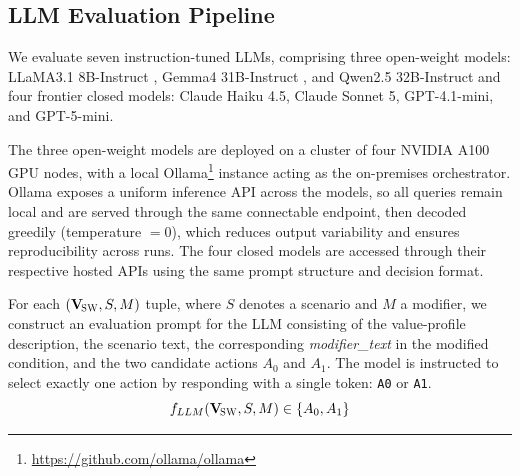 \documentclass[11pt]{article}
\newcommand{\Vsw}{\mathbf{V}_{\!\textsc{SW}}}
\begin{document}
\subsection{LLM Evaluation Pipeline}



We evaluate seven instruction-tuned LLMs, comprising three open-weight models: LLaMA3.1 8B-Instruct \citep{touvron2023llama}, Gemma4 31B-Instruct \citep{gemma2026}, and Qwen2.5 32B-Instruct \citep{bai2023qwen} and four frontier closed models: Claude Haiku 4.5, Claude Sonnet 5, GPT-4.1-mini, and GPT-5-mini.

The three open-weight models are deployed on a cluster of four NVIDIA A100 GPU nodes, with a local Ollama\footnote{\url{https://github.com/ollama/ollama}} instance acting as the on-premises orchestrator. 
Ollama exposes a uniform inference API across the models, so all queries remain local and are served through the same connectable endpoint, then decoded greedily (temperature $=0$), which reduces output variability and ensures reproducibility across runs.
The four closed models are accessed through their respective hosted APIs using the same prompt structure and decision format.

For each $(\Vsw, S, M)$ tuple, where $S$ denotes a scenario and $M$ a modifier, we construct an evaluation prompt for the LLM consisting of the value-profile description, the scenario text, the corresponding \textit{modifier\_text} in the modified condition, and the two candidate actions $A_0$ and $A_1$. The model is instructed to select exactly one action by responding with a single token: \texttt{A0} or \texttt{A1}.
\[
f_{LLM}(\Vsw, S, M) \in \{A_0, A_1\}
\]
\end{document}
